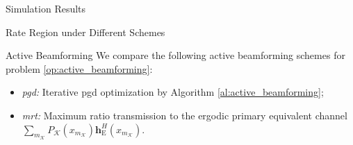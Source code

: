 \documentclass[journal]{IEEEtran}
\begin{document}
\begin{section}{Simulation Results}
\begin{subsection}{Rate Region under Different Schemes}
		\begin{subsubsection}{Active Beamforming}
			We compare the following active beamforming schemes for problem \eqref{op:active_beamforming}:
			\begin{itemize}
				\item \emph{\gls{pgd}:} Iterative \gls{pgd} optimization by Algorithm \ref{al:active_beamforming};
				\item \emph{\gls{mrt}:} Maximum ratio transmission to the ergodic primary equivalent channel $\sum_{m_{\mathcal{K}}} P_{\mathcal{K}}(x_{m_{\mathcal{K}}}) \boldsymbol{h}_{\mathrm{E}}^H(x_{m_{\mathcal{K}}})$.
			\end{itemize}


\end{subsubsection}
\end{subsection}
\end{section}
\end{document}
